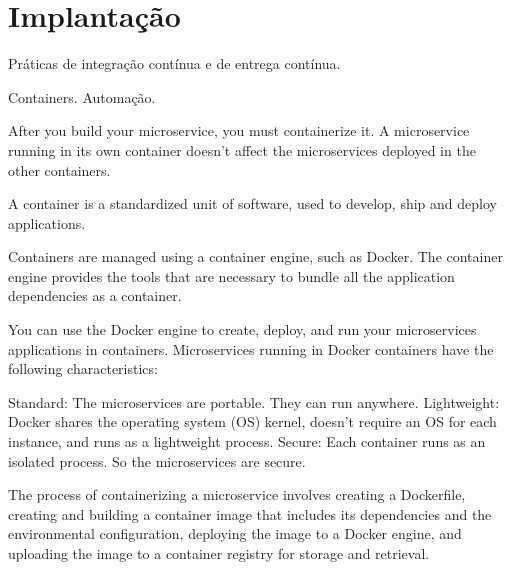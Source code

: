 



\section{Implantação}
Práticas de integração contínua e de entrega contínua. 

Containers. Automação.

After you build your microservice, you must containerize it. A microservice running in its own container doesn’t affect the microservices deployed in the other containers.

A container is a standardized unit of software, used to develop, ship and deploy applications.

Containers are managed using a container engine, such as Docker. The container engine provides the tools that are necessary to bundle all the application dependencies as a container.

You can use the Docker engine to create, deploy, and run your microservices applications in containers. Microservices running in Docker containers have the following characteristics:

Standard: The microservices are portable. They can run anywhere.
Lightweight: Docker shares the operating system (OS) kernel, doesn’t require an OS for each instance, and runs as a lightweight process.
Secure: Each container runs as an isolated process. So the microservices are secure.

The process of containerizing a microservice involves creating a Dockerfile, creating and building a container image that includes its dependencies and the environmental configuration, deploying the image to a Docker engine, and uploading the image to a container registry for storage and retrieval. 

